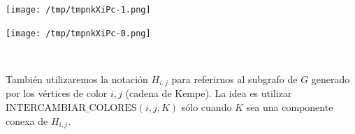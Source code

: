 \documentclass[10pt,a4paper]{article}
\begin{document}
\begin{center}

    \begin{adjustbox}{max size={\textwidth}{\textheight}}
        \texttt{[image: /tmp/tmpnkXiPc-1.png]}
        \end{adjustbox}
    
    \begin{adjustbox}{max size={\textwidth}{\textheight}}
        \texttt{[image: /tmp/tmpnkXiPc-0.png]}
        \end{adjustbox}
    
\end{center}

\begin{center}
 
\end{center}

También utilizaremos la notación $H_{i, j}$ para referirnos al subgrafo de $G$ generado por los vértices de color $i, j$ (cadena de Kempe). La idea es utilizar $\text{INTERCAMBIAR_COLORES}(i, j, K)$ sólo cuando $K$ sea una componente conexa de $H_{i,j}$.

 
\end{document}
